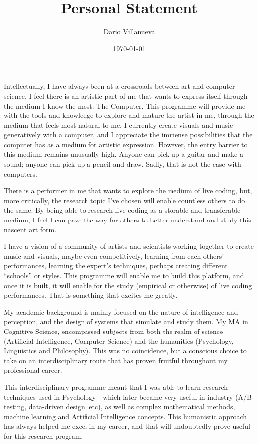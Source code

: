\documentclass[12pt]{article}
\title{Personal Statement}
\date{\today}
\author{Dario Villanueva}
\begin{document}
\maketitle

Intellectually, I have always been at a crossroads between art and computer science. I feel there is an artistic part of me that wants to express itself through the medium I know the most: The Computer. This programme will provide me with the tools and knowledge to explore and mature the artist in me, through the medium that feels most natural to me. I currently create visuals and music generatively with a computer, and I appreciate the immense possibilities that the computer has as a medium for artistic expression. However, the entry barrier to this medium remains unusually high. Anyone can pick up a guitar and make a sound; anyone can pick up a pencil and draw. Sadly, that is not the case with computers.

There is a performer in me that wants to explore the medium of live coding, but, more critically, the research topic I've chosen will enable countless others to do the same. By being able to research live coding as a storable and transferable medium, I feel I can pave the way for others to better understand and study this nascent art form. 

I have a vision of a community of artists and scientists working together to create music and visuals, maybe even competitively, learning from each others’ performances, learning the expert’s techniques, perhaps creating different “schools” or styles. This programme will enable me to build this platform, and once it is built, it will enable for the study (empirical or otherwise) of live coding performances. That is something that excites me greatly.

My academic background is mainly focused on the nature of intelligence and perception, and the design of systems that simulate and study them. My MA in Cognitive Science, encompassed subjects from both the realm of science (Artificial Intelligence, Computer Science) and the humanities (Psychology, Linguistics and Philosophy). This was no coincidence, but a conscious choice to take on an interdisciplinary route that has proven fruitful throughout my professional career.

This interdisciplinary programme meant that I was able to learn research techniques used in Psychology - which later became very useful in industry (A/B testing, data-driven design, etc), as well as complex mathematical methods, machine learning and Artificial Intelligence concepts. This humanistic approach has always helped me excel in my career, and that will undoubtedly prove useful for this research program.
\end{document}
